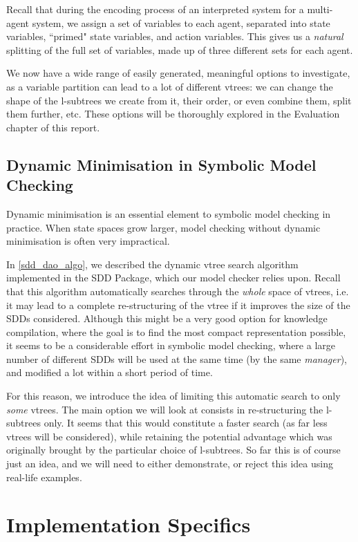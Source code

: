 \documentclass[11pt]{report}
\begin{document}
Recall that during the encoding process of an interpreted system for a multi-agent system, we assign a set of variables to each agent, separated into state variables, ``primed" state variables, and action variables. This gives us a \textit{natural} splitting of the full set of variables, made up of three different sets for each agent.

We now have a wide range of easily generated, meaningful options to investigate, as a variable partition can lead to a lot of different vtrees: we can change the shape of the l-subtrees we create from it, their order, or even combine them, split them further, etc. These options will be thoroughly explored in the Evaluation chapter of this report. 

\subsection{Dynamic Minimisation in Symbolic Model Checking}
\label{dynamic_with_sdds}
Dynamic minimisation is an essential element to symbolic model checking in practice. When state spaces grow larger, model checking without dynamic minimisation is often very impractical. 

In \ref{sdd_dao_algo}, we described the dynamic vtree search algorithm implemented in the SDD Package, which our model checker relies upon. Recall that this algorithm automatically searches through the \textit{whole} space of vtrees, i.e. it may lead to a complete re-structuring of the vtree if it improves the size of the SDDs considered. Although this might be a very good option for knowledge compilation, where the goal is to find the most compact representation possible, it seems to be a considerable effort in symbolic model checking, where a large number of different SDDs will be used at the same time (by the same \textit{manager}), and modified a lot within a short period of time.

For this reason, we introduce the idea of limiting this automatic search to only \textit{some} vtrees. The main option we will look at consists in re-structuring the l-subtrees only. It seems that this would constitute a faster search (as far less vtrees will be considered), while retaining the potential advantage which was originally brought by the particular choice of l-subtrees. So far this is of course just an idea, and we will need to either demonstrate, or reject this idea using real-life examples.

\section{Implementation Specifics}
\label{implementation}
\end{document}
